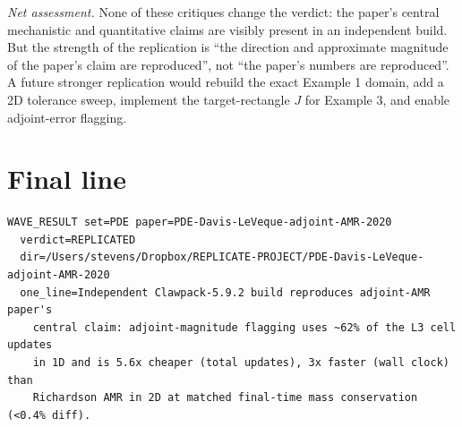 \documentclass[11pt]{article}
\begin{document}
\emph{Net assessment.} None of these critiques change the verdict: the paper's
central mechanistic and quantitative claims are visibly present in an
independent build. But the strength of the replication is ``the direction and
approximate magnitude of the paper's claim are reproduced'', not ``the paper's
numbers are reproduced''. A future stronger replication would rebuild the exact
Example 1 domain, add a 2D tolerance sweep, implement the target-rectangle $J$
for Example 3, and enable adjoint-error flagging.

\section{Final line}
\begin{lstlisting}
WAVE_RESULT set=PDE paper=PDE-Davis-LeVeque-adjoint-AMR-2020
  verdict=REPLICATED
  dir=/Users/stevens/Dropbox/REPLICATE-PROJECT/PDE-Davis-LeVeque-adjoint-AMR-2020
  one_line=Independent Clawpack-5.9.2 build reproduces adjoint-AMR paper's
    central claim: adjoint-magnitude flagging uses ~62% of the L3 cell updates
    in 1D and is 5.6x cheaper (total updates), 3x faster (wall clock) than
    Richardson AMR in 2D at matched final-time mass conservation (<0.4% diff).
\end{lstlisting}
\end{document}

